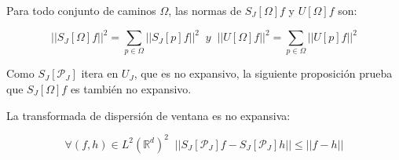 \medskip

\noindent Para todo conjunto de caminos $\Omega$, las normas de $S_J[\Omega]f$ y $U[\Omega]f$ son: 

$$\left|\left| S_J[\Omega]f \right|\right|^2=\sum_{p\in\Omega} \left|\left| S_J[p]f\right|\right|^2 \;\; y \;\; \left|\left|U[\Omega]f\right|\right|^2=\sum_{p\in\Omega} \left|\left| U[p]f\right|\right|^2$$

\noindent Como $S_J[\mathcal{P}_J]$ itera en $U_J$, que es no expansivo, la siguiente proposición prueba que $S_J[\Omega]f$ es también no expansivo. 

\begin{proposicion} \label{proposicion::NoExpansiva}
La transformada de dispersión de ventana es no expansiva: 

\begin{equation}
  \forall (f,h)\in L^2(\mathbb{R}^d)^2 \;\; ||S_J[\mathcal{P}_J]f-S_J[\mathcal{P}_J]h|| \leq ||f-h||
\end{equation}
\end{proposicion}

